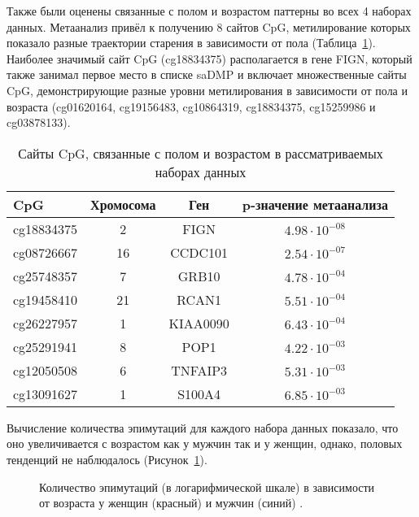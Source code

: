 Также были оценены связанные с полом и возрастом паттерны во всех 4 наборах данных. Метаанализ привёл к получению 8 сайтов CpG, метилирование которых показало разные траектории старения в зависимости от пола (Таблица~\ref{tab:saDMP}). Наиболее значимый сайт CpG (cg18834375) располагается в гене FIGN, который также занимал первое место в списке saDMP и включает множественные сайты CpG, демонстрирующие разные уровни метилирования в зависимости от пола и возраста (cg01620164, cg19156483, cg10864319, cg18834375, cg15259986 и cg03878133).

\begin{table} [htbp]
	\centering
	\begin{threeparttable}
		\caption{Сайты CpG, связанные с полом и возрастом в рассматриваемых наборах данных}\label{tab:saDMP}
		\begin{SingleSpace}
			\begin{tabular}{| l | c | c | c | }
				\hline
				CpG & Хромосома & Ген & p-значение метаанализа \\
				\hline
				cg18834375 & 2 & FIGN & $4.98 \cdot 10^{-08}$ \\
				\hline
				cg08726667 & 16 & CCDC101 & $2.54 \cdot 10^{-07}$ \\
				\hline
				cg25748357 & 7 & GRB10 & $4.78 \cdot 10^{-04}$  \\
				\hline
				cg19458410 & 21 & RCAN1 & $5.51 \cdot 10^{-04}$ \\
				\hline
				cg26227957 & 1 & KIAA0090 & $6.43 \cdot 10^{-04}$ \\
				\hline
				cg25291941 & 8 & POP1 & $4.22 \cdot 10^{-03}$ \\
				\hline
				cg12050508 & 6 & TNFAIP3 & $5.31 \cdot 10^{-03}$ \\
				\hline
				cg13091627 & 1 & S100A4 & $6.85 \cdot 10^{-03}$ \\
				\hline
			\end{tabular}%
		\end{SingleSpace}
	\end{threeparttable}
\end{table}

Вычисление количества эпимутаций для каждого набора данных показало, что оно увеличивается с возрастом как у мужчин так и у женщин, однако, половых тенденций не наблюдалось (Рисунок~\ref{fig:epimutations}). 

\begin{figure}[ht]
	\caption[Количество эпимутаций (в логарифмической шкале) в зависимости от возраста у женщин и мужчин.]{Количество эпимутаций (в логарифмической шкале) в зависимости от возраста у женщин (красный) и мужчин (синий) \autocite{Yusipov2020}.}\label{fig:epimutations}
\end{figure}

